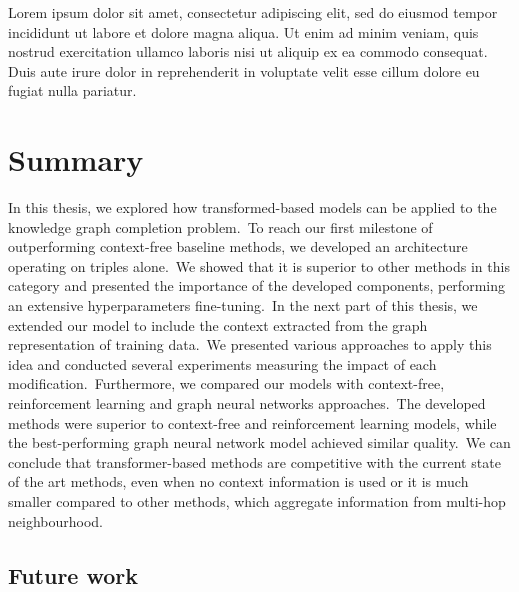 \documentclass[longabstract, english, mgr]{iithesis}
\newcommand\numberedchapter[1]{\setlength\topskip{3cm}\chapter{#1}\setlength\topskip{0cm}}
\theoremstyle{default_theorem_style}\newtheorem{theorem}{Theorem}
\theoremstyle{default_theorem_style}\newtheorem{definition}{Definition}
\begin{document}
\noindent Lorem ipsum dolor sit amet, consectetur adipiscing elit, sed do eiusmod tempor incididunt ut
labore et dolore magna aliqua. Ut enim ad minim veniam, quis nostrud exercitation ullamco laboris nisi
ut aliquip ex ea commodo consequat. Duis aute irure dolor in reprehenderit in voluptate velit esse
cillum dolore eu fugiat nulla pariatur. \newline


\numberedchapter{Summary}

In this thesis, we explored how transformed-based models can be applied to the knowledge graph completion
problem.\ To reach our first milestone of outperforming context-free baseline methods, we developed an architecture
operating on triples alone.\ We showed that it is superior to other methods in this category and presented the
importance of the developed components, performing an extensive hyperparameters fine-tuning.\ In the next part of this
thesis, we extended our model to include the context extracted from the graph representation of training data.\ We
presented various approaches to apply this idea and conducted several experiments measuring the impact of each
modification.\ Furthermore, we compared our models with context-free, reinforcement learning and graph neural networks
approaches.\ The developed methods were superior to context-free and reinforcement learning models, while the
best-performing graph neural network model achieved similar quality.\ We can conclude that transformer-based methods
are competitive with the current state of the art methods, even when no context information is used or it is much
smaller compared to other methods, which aggregate information from multi-hop neighbourhood.

\section{Future work}
\end{document}
